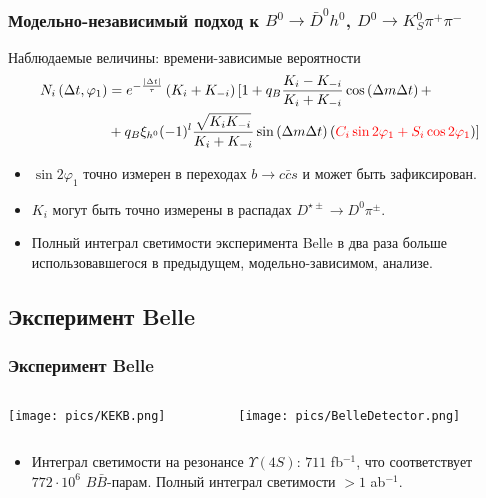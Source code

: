 \documentclass[10 pt,compress,mathserif]{beamer}
\newcommand{\dkspp}{\ensuremath{D^0\to K_S^0\pi^+\pi^-}\xspace}
\newcommand{\bdh}{\ensuremath{B^0\to \bar D^0h^0}\xspace}
\begin{document}
\begin{frame}
 \frametitle{Модельно-независимый подход к \bdh, \dkspp}
 \begin{small}
 Наблюдаемые величины: времени-зависимые вероятности
 \begin{equation*}
 \begin{split}
  N_i\left(\Delta t,\varphi_1\right) &= e^{-\frac{\left|\Delta t\right|}{\tau}}\left(K_{i}+K_{-i}\right)[ 1 + q_{B}\frac{K_{i}-K_{-i}}{K_{i}+K_{-i}}\cos\left(\Delta m\Delta t\right)+\\
  &+q_{B}\xi_{h^0}(-1)^l\frac{\sqrt{K_iK_{-i}}}{K_{i}+K_{-i}}\sin\left(\Delta m\Delta t\right)\left(\textcolor{red}{C_i\sin2\varphi_1+S_i\cos2\varphi_1}\right)]
 \end{split}
 \end{equation*}
 
 \begin{itemize}
  \item $\sin2\varphi_1$ точно измерен в переходах $b\to c\bar c s$ и может быть зафиксирован.
  \item $K_i$ могут быть точно измерены в распадах $D^{\star\pm}\to D^0\pi^{\pm}$.
  \item Полный интеграл светимости эксперимента Belle в два раза больше использовавшегося в предыдущем, модельно-зависимом, анализе.
 \end{itemize}
 \end{small}
\end{frame}

\subsection{Эксперимент Belle}
\begin{frame}
 \frametitle{Эксперимент Belle}
 \begin{small}
 \begin{columns}
  \begin{column}{0.5\textwidth}
   \texttt{[image: pics/KEKB.png]}
  \end{column}
  \begin{column}{0.5\textwidth}
   \texttt{[image: pics/BelleDetector.png]}
  \end{column}
 \end{columns}
  \begin{itemize}
   \item Интеграл светимости на резонансе $\Upsilon(4S)$: $711$ fb$^{-1}$, что соответствует $772\cdot 10^6$ $B\bar B$-парам. Полный интеграл светимости $>1$ ab$^{-1}$.
  \end{itemize}
 \end{small}
\end{frame}
\end{document}
